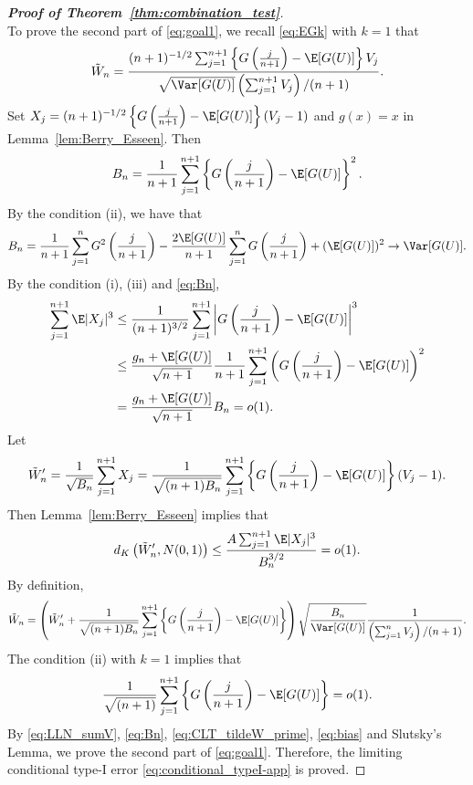 \begin{proof}[\textbf{Proof of Theorem~\ref{thm:combination_test}}]
~\\
\noindent To prove the second part of \eqref{eq:goal1}, we recall \eqref{eq:EGk} with $k = 1$ that
\[\tilde{W}_{n} = \frac{(n + 1
)^{-1/2}\sum_{j=1}^{n+1}\left\{G\left(\frac{j}{n+1}\right) - \E[G(U)]\right\}V_{j}}{\sqrt{\Var[G(U)]}\left(\sum_{j=1}^{n+1}V_{j}\right)/(n+1)}.\]
Set $X_j = (n + 1)^{-1/2}\left\{G\left(\frac{j}{n+1}\right) - \E[G(U)]\right\}(V_{j} - 1)$ and $g(x) = x$ in Lemma~\ref{lem:Berry_Esseen}. Then
\[B_{n} = \frac{1}{n+1}\sum_{j=1}^{n+1}\left\{G\left(\frac{j}{n+1}\right) - \E[G(U)]\right\}^2.\]
By the condition (ii), we have that
\begin{equation}\label{eq:Bn}
B_{n} = \frac{1}{n+1}\sum_{j=1}^{n}G^2\left(\frac{j}{n+1}\right) - \frac{2\E[G(U)]}{n+1}\sum_{j=1}^{n}G\left(\frac{j}{n+1}\right) + (\E[G(U)])^2\rightarrow \Var[G(U)].
\end{equation}
By the condition (i), (iii) and \eqref{eq:Bn},
\begin{align*}
\sum_{j=1}^{n+1}\E|X_j|^3
&\le \frac{1}{(n+1)^{3/2}}\sum
_{j=1}^{n+1}\bigg|G\left(\frac{j}{n+1}\right) - \E[G(U)]\bigg|^3\\
&\le \frac{g_{n} + \E[G(U)]}{\sqrt{n+1}}\frac{1}{n+1}\sum_{j=1}^{n+1}\left(G\left(\frac{j}{n+1}\right) - \E[G(U)]\right)^2\\
&= \frac{g_{n} + \E[G(U)]}{\sqrt{n+1}}B_{n} = o(1).
\end{align*}
Let
\[\tilde{W}'_{n} = \frac{1}{\sqrt{B_n}}\sum_{j=1}^{n+1}X_j = \frac{1}{\sqrt{(n + 1)B_{n}}}\sum_{j=1}^{n+1}\left\{G\left(\frac{j}{n+1}\right) - \E[G(U)]\right\}(V_{j} - 1).\]
Then Lemma~\ref{lem:Berry_Esseen} implies that
\begin{equation}\label{eq:CLT_tildeW_prime}
d_{K}\left(\tilde{W}'_{n}, N(0, 1)\right)\le \frac{A\sum_{j=1}^{n+1}\E|X_j|^3}{B_{n}^{3/2}} = o(1).
\end{equation}
By definition,
\[\tilde{W}_{n} = \left(\tilde{W}'_{n} + \frac{1}{\sqrt{(n + 1)B_{n}}}\sum_{j=1}^{n+1}\left\{G\left(\frac{j}{n+1}\right) - \E[G(U)]\right\}\right)\sqrt{\frac{B_{n}}{\Var[G(U)]}}\frac{1}{\left(\sum_{j=1}^{n}V_{j}\right) / (n+1)}.\]
The condition (ii) with $k = 1$ implies that
\begin{equation}\label{eq:bias}
\frac{1}{\sqrt{(n + 1)}}\sum_{j=1}^{n+1}\left\{G\left(\frac{j}{n+1}\right)- \E[G(U)]\right\} = o(1).
\end{equation}
By \eqref{eq:LLN_sumV}, \eqref{eq:Bn}, \eqref{eq:CLT_tildeW_prime}, \eqref{eq:bias} and Slutsky's Lemma, we prove the second part of \eqref{eq:goal1}. Therefore, the limiting conditional type-I error \eqref{eq:conditional_typeI-app} is proved.


\end{proof}
